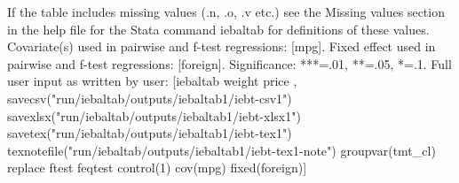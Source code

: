 If the table includes missing values (.n, .o, .v etc.) see the Missing values section in the help file for the Stata command iebaltab for definitions of these values. Covariate(s) used in pairwise and f-test regressions: [mpg]. Fixed effect used in pairwise and f-test regressions: [foreign]. Significance: ***=.01, **=.05, *=.1. Full user input as written by user: [iebaltab weight price , savecsv("run/iebaltab/outputs/iebaltab1/iebt-csv1") savexlsx("run/iebaltab/outputs/iebaltab1/iebt-xlsx1") savetex("run/iebaltab/outputs/iebaltab1/iebt-tex1") texnotefile("run/iebaltab/outputs/iebaltab1/iebt-tex1-note") groupvar(tmt\_cl) replace ftest feqtest control(1) cov(mpg) fixed(foreign)] 
